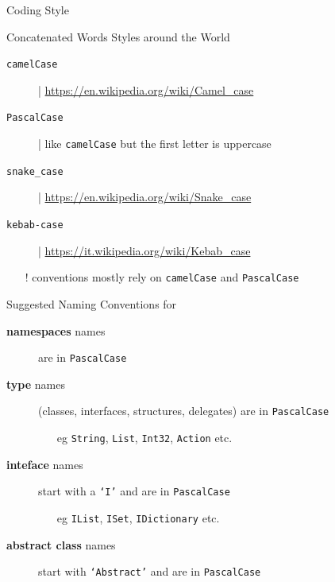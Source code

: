 \documentclass[presentation]{beamer}
\begin{document}
\begin{frame}[allowframebreaks]{\csharp Coding Style}

    \begin{block}{Concatenated Words Styles around the World}
        \begin{description}
            \item[\texttt{camelCase}] | \url{https://en.wikipedia.org/wiki/Camel_case}
            \item[\texttt{PascalCase}] | like \texttt{camelCase} but the first letter is uppercase
            \item[\texttt{snake\_case}] |  \url{https://en.wikipedia.org/wiki/Snake_case}
            \item[\texttt{kebab-case}] |  \url{https://it.wikipedia.org/wiki/Kebab_case} 
        \end{description}
        \begin{itemize}
            \item[!] \dotnet conventions mostly rely on \texttt{camelCase} and \texttt{PascalCase}
        \end{itemize}
    \end{block}

    \begin{exampleblock}{Suggested Naming Conventions for \csharp}
        \begin{description}
            \item[\textbf{namespaces} names] are in \texttt{PascalCase} 

            \item[\textbf{type} names] (classes, interfaces, structures, delegates) are in \texttt{PascalCase}  
            \begin{itemize}
                \item[eg] \texttt{String}, \texttt{List}, \texttt{Int32}, \texttt{Action} etc.
            \end{itemize} 

            \item[\textbf{inteface} names] start with a \texttt{`I'} and are in \texttt{PascalCase} 
            \begin{itemize}
                \item[eg] \texttt{IList}, \texttt{ISet}, \texttt{IDictionary} etc.
            \end{itemize} 

            \item[\textbf{abstract class} names] start with \texttt{`Abstract'} and are in \texttt{PascalCase} 
            

\end{description}
\end{exampleblock}
\end{frame}
\end{document}

